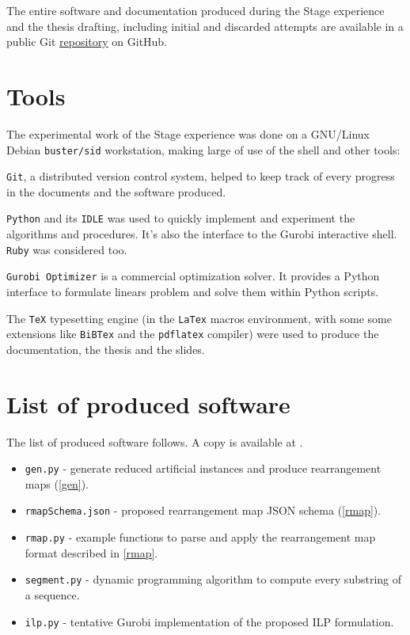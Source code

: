 The entire software and documentation produced during the Stage experience and the thesis drafting, including initial and discarded attempts are available in a public Git \href{https://github.com/avivace/dna-recombination}{repository} \cite{avivace_repo} on GitHub.

\section{Tools}
The experimental work of the Stage experience was done on a GNU/Linux Debian \texttt{buster/sid} workstation, making large of use of the shell and other tools:

\texttt{Git}, a distributed version control system, helped to keep track of every progress in the documents and the software produced.

\texttt{Python} \cite{Rossum:1995:PRM:869369} and its \texttt{IDLE} was used to quickly implement and experiment the algorithms and procedures. It's also the interface to the Gurobi interactive shell. \texttt{Ruby} was considered too.

\texttt{Gurobi Optimizer} \cite{gurobi} is a commercial optimization solver. It provides a Python interface to formulate linears problem and solve them within Python scripts.

The \texttt{TeX} typesetting engine (in the \texttt{LaTex} macros environment, with some some extensions like \texttt{BiBTex} and the \texttt{pdflatex} compiler) were used to produce the documentation, the thesis and the slides.

\section{List of produced software}
The list of produced software follows. A copy is available at \cite{avivace_repo}.
\begin{itemize}
	\item \texttt{gen.py} - generate reduced artificial instances and produce rearrangement maps (\ref{gen}).
	\item \texttt{rmapSchema.json} - proposed rearrangement map JSON schema (\ref{rmap}).
	\item \texttt{rmap.py} - example functions to parse and apply the rearrangement map format described in \ref{rmap}.
	\item \texttt{segment.py} - dynamic programming algorithm to compute every substring of a sequence.
	\item \texttt{ilp.py} - tentative Gurobi implementation of the proposed ILP formulation.
\end{itemize}

